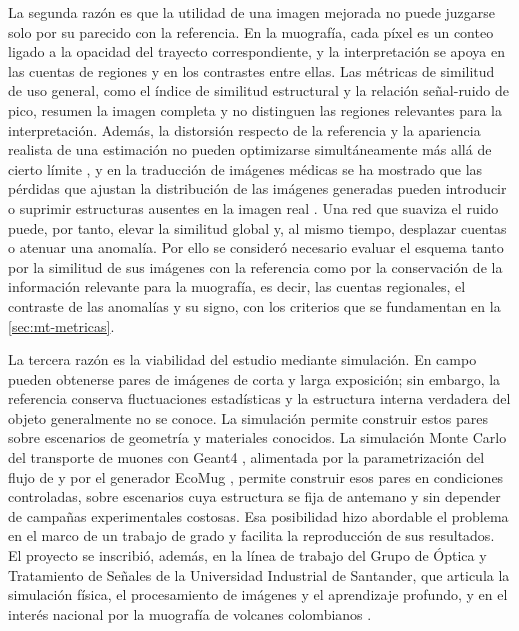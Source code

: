 La segunda razón es que la utilidad de una imagen mejorada no puede juzgarse solo por su parecido con la referencia. En la muografía, cada píxel es un conteo ligado a la opacidad del trayecto correspondiente, y la interpretación se apoya en las cuentas de regiones y en los contrastes entre ellas. Las métricas de similitud de uso general, como el índice de similitud estructural y la relación señal-ruido de pico, resumen la imagen completa y no distinguen las regiones relevantes para la interpretación. Además, la distorsión respecto de la referencia y la apariencia realista de una estimación no pueden optimizarse simultáneamente más allá de cierto límite \parencite{blau2018}, y en la traducción de imágenes médicas se ha mostrado que las pérdidas que ajustan la distribución de las imágenes generadas pueden introducir o suprimir estructuras ausentes en la imagen real \parencite{cohen2018}. Una red que suaviza el ruido puede, por tanto, elevar la similitud global y, al mismo tiempo, desplazar cuentas o atenuar una anomalía. Por ello se consideró necesario evaluar el esquema tanto por la similitud de sus imágenes con la referencia como por la conservación de la información relevante para la muografía, es decir, las cuentas regionales, el contraste de las anomalías y su signo, con los criterios que se fundamentan en la \cref{sec:mt-metricas}.

La tercera razón es la viabilidad del estudio mediante simulación. En campo pueden obtenerse pares de imágenes de corta y larga exposición; sin embargo, la referencia conserva fluctuaciones estadísticas y la estructura interna verdadera del objeto generalmente no se conoce. La simulación permite construir estos pares sobre escenarios de geometría y materiales conocidos. La simulación Monte Carlo del transporte de muones con Geant4 \parencite{agostinelli2003,allison2016}, alimentada por la parametrización del flujo de \textcite{guan2015muonflux} y por el generador EcoMug \parencite{pagano2021}, permite construir esos pares en condiciones controladas, sobre escenarios cuya estructura se fija de antemano y sin depender de campañas experimentales costosas. Esa posibilidad hizo abordable el problema en el marco de un trabajo de grado y facilita la reproducción de sus resultados. El proyecto se inscribió, además, en la línea de trabajo del Grupo de Óptica y Tratamiento de Señales de la Universidad Industrial de Santander, que articula la simulación física, el procesamiento de imágenes y el aprendizaje profundo, y en el interés nacional por la muografía de volcanes colombianos \parencite{penarodriguez2020}.

